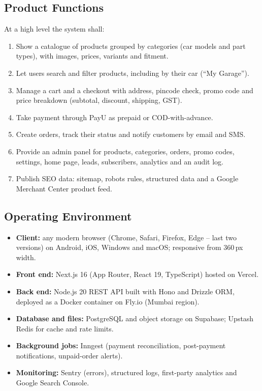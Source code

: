 \documentclass[11pt,a4paper]{article}
\begin{document}
\subsection{Product Functions}
At a high level the system shall:
\begin{enumerate}
  \item Show a catalogue of products grouped by categories (car models and part types),
        with images, prices, variants and fitment.
  \item Let users search and filter products, including by their car (``My Garage'').
  \item Manage a cart and a checkout with address, pincode check, promo code and price
        breakdown (subtotal, discount, shipping, GST).
  \item Take payment through PayU as prepaid or COD-with-advance.
  \item Create orders, track their status and notify customers by email and SMS.
  \item Provide an admin panel for products, categories, orders, promo codes, settings,
        home page, leads, subscribers, analytics and an audit log.
  \item Publish SEO data: sitemap, robots rules, structured data and a Google Merchant
        Center product feed.
\end{enumerate}

\subsection{Operating Environment}
\begin{itemize}
  \item \textbf{Client:} any modern browser (Chrome, Safari, Firefox, Edge -- last two
        versions) on Android, iOS, Windows and macOS; responsive from 360\,px width.
  \item \textbf{Front end:} Next.js 16 (App Router, React 19, TypeScript) hosted on Vercel.
  \item \textbf{Back end:} Node.js 20 REST API built with Hono and Drizzle ORM, deployed
        as a Docker container on Fly.io (Mumbai region).
  \item \textbf{Database and files:} PostgreSQL and object storage on Supabase; Upstash
        Redis for cache and rate limits.
  \item \textbf{Background jobs:} Inngest (payment reconciliation, post-payment
        notifications, unpaid-order alerts).
  \item \textbf{Monitoring:} Sentry (errors), structured logs, first-party analytics and
        Google Search Console.
\end{itemize}
\end{document}

